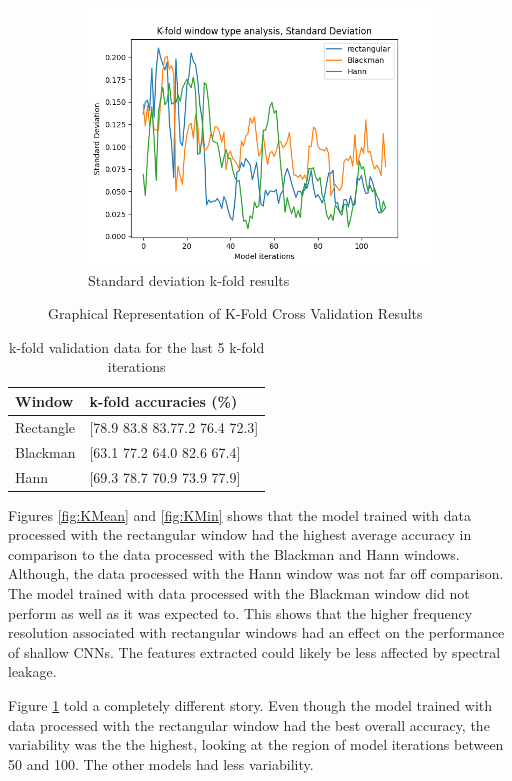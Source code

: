 \documentclass[class=report,11pt,crop=false]{standalone}
\begin{document}
\begin{figure}[hbt!]
\begin{subfigure}[b]{0.5\textwidth}
        \includegraphics[width=\linewidth]{Images/kfoldStandard Deviation.png}
        \caption{Standard deviation k-fold results}
        \label{fig:KStd}
    \end{subfigure}
    \caption{Graphical Representation of K-Fold Cross Validation Results}
    \label{fig:K-Fold}
\end{figure}
 
\begin{table}[h]
\centering
\begin{tabular}{|l|l|}
\hline
\textbf{Window} & \textbf{k-fold accuracies (\%)} \\
\hline
Rectangle & [78.9 83.8 83.77.2 76.4 72.3] \\
Blackman & [63.1 77.2 64.0 82.6 67.4] \\
Hann & [69.3 78.7 70.9 73.9 77.9] \\
\hline
\end{tabular}
\caption{k-fold validation data for the last 5 k-fold iterations}
\label{tab:k-fold-average}
\end{table}

Figures \ref{fig:KMean} and \ref{fig:KMin} shows that the model trained with data processed with the rectangular window had the highest average accuracy in comparison to the data processed with the Blackman and Hann windows. Although, the data processed with the Hann window was not far off comparison. The model trained with data processed with the Blackman window did not perform as well as it was expected to. This shows that the higher frequency resolution associated with rectangular windows had an effect on the performance of shallow CNNs. The features extracted could likely be less affected by spectral leakage. 

Figure \ref{fig:KStd} told a completely different story. Even though the model trained with data processed with the rectangular window had the best overall accuracy, the variability was the the highest, looking at the region of model iterations between 50 and 100. The other models had less variability. 

\ifstandalone

\printnoidxglossary[type=\acronymtype,nonumberlist]
\fi
\end{document}
